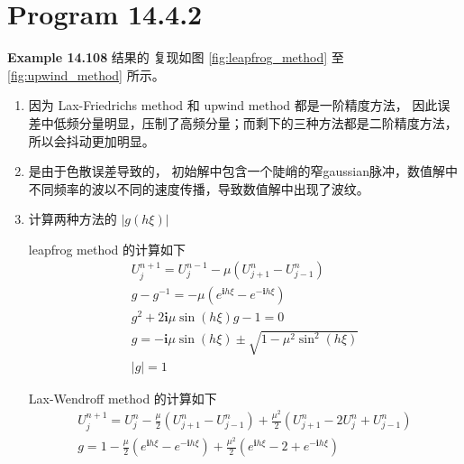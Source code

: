 \documentclass[a4paper]{article}
\begin{document}
\section*{Program 14.4.2}

\par \textbf{Example 14.108} 结果的
复现如图 \ref{fig:leapfrog_method}
至 \ref{fig:upwind_method} 所示。

\begin{enumerate}
    \item[(a)] 因为 Lax-Friedrichs method 和 upwind method 都是一阶精度方法，
    因此误差中低频分量明显，压制了高频分量；而剩下的三种方法都是二阶精度方法，所以会抖动更加明显。
    \item[(b)] 是由于色散误差导致的，
    初始解中包含一个陡峭的窄gaussian脉冲，数值解中
    不同频率的波以不同的速度传播，导致数值解中出现了波纹。
    \item[(c)] 计算两种方法的 $|g(h\xi)|$
    \par leapfrog method 的计算如下
    \begin{equation}
        \begin{gathered}
            U_{j}^{n+1} = U_{j}^{n-1} - \mu\left(
                U_{j+1}^{n} - U_{j-1}^{n}
            \right)\\
            g-g^{-1} = -\mu\left(
                e^{\mathbf{i}h\xi}-e^{-\mathbf{i}h\xi}
            \right)\\
            g^2 + 2\mathbf{i}\mu\sin(h\xi)g - 1 = 0\\
            g = -\mathbf{i}\mu\sin(h\xi) \pm \sqrt{1-\mu^2\sin^2(h\xi)}\\
            |g| = 1
        \end{gathered}
    \end{equation}
    \par Lax-Wendroff method 的计算如下
    \begin{equation}
        \begin{gathered}
            U_{j}^{n+1} = U_{j}^{n} - \frac{\mu}{2}\left(
                U_{j+1}^{n}-U_{j-1}^{n}    
                \right)
                + \frac{\mu^2}{2}\left(
                    U_{j+1}^{n}-2U_{j}^{n}+U_{j-1}^{n}
                \right)\\
            g = 1 - \frac{\mu}{2}\left(
                e^{\mathbf{i}h\xi}-e^{-\mathbf{i}h\xi}    
                \right)
                + \frac{\mu^2}{2}\left(
                    e^{\mathbf{i}h\xi}-2+e^{-\mathbf{i}h\xi}    
                \right)\\

\end{gathered}
\end{equation}
\end{enumerate}
\end{document}

